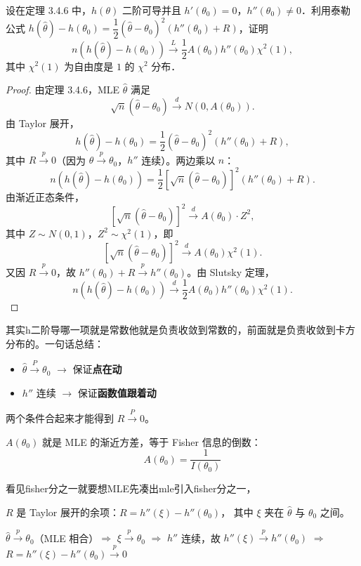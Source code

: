 \begin{homework}[12]
设在定理 3.4.6 中，$h(\theta)$ 二阶可导并且 $h'(\theta_0) = 0$，$h''(\theta_0) \neq 0$．利用泰勒公式 $h(\hat{\theta}) - h(\theta_0) = \dfrac{1}{2}(\hat{\theta} - \theta_0)^2 (h''(\theta_0) + R)$，证明
\[
n(h(\hat{\theta}) - h(\theta_0)) \xrightarrow{L} \frac{1}{2} A(\theta_0) h''(\theta_0) \chi^2(1),
\]
其中 $\chi^2(1)$ 为自由度是 $1$ 的 $\chi^2$ 分布．
\end{homework}
\begin{proof}
由定理 3.4.6，MLE $\hat{\theta}$ 满足
$$\sqrt{n}(\hat{\theta} - \theta_0) \xrightarrow{d} N(0, A(\theta_0)).$$
由 Taylor 展开，
$$h(\hat{\theta}) - h(\theta_0) = \frac{1}{2}(\hat{\theta} - \theta_0)^2(h''(\theta_0) + R),$$
其中 $R \xrightarrow{p} 0$（因为 $\hat{\theta} \xrightarrow{p} \theta_0$，$h''$ 连续）。两边乘以 $n$：
$$n(h(\hat{\theta}) - h(\theta_0)) = \frac{1}{2}\left[\sqrt{n}(\hat{\theta} - \theta_0)\right]^2 (h''(\theta_0) + R).$$
由渐近正态条件，
$$\left[\sqrt{n}(\hat{\theta} - \theta_0)\right]^2 \xrightarrow{d} A(\theta_0) \cdot Z^2,$$
其中 $Z \sim N(0,1)$，$Z^2 \sim \chi^2(1)$，即
$$\left[\sqrt{n}(\hat{\theta} - \theta_0)\right]^2 \xrightarrow{d} A(\theta_0)\chi^2(1).$$
又因 $R \xrightarrow{p} 0$，故 $h''(\theta_0) + R \xrightarrow{p} h''(\theta_0)$。由 Slutsky 定理，
$$n(h(\hat{\theta}) - h(\theta_0)) \xrightarrow{d} \frac{1}{2}A(\theta_0)h''(\theta_0)\chi^2(1).$$
\end{proof}
\begin{dxtips}
    其实h二阶导哪一项就是常数他就是负责收敛到常数的，前面就是负责收敛到卡方分布的。一句话总结：
\begin{itemize}
    \item $\hat{\theta} \xrightarrow{P} \theta_0$ $\rightarrow$ 保证\textbf{点在动}
    \item $h''$ 连续 $\rightarrow$ 保证\textbf{函数值跟着动}
\end{itemize}
两个条件合起来才能得到 $R \xrightarrow{P} 0$。
\end{dxtips}
\begin{dxtips}
$A(\theta_0)$ 就是 MLE 的渐近方差，等于 Fisher 信息的倒数：
$$A(\theta_0) = \frac{1}{I(\theta_0)}$$
\end{dxtips}
\begin{dxtips}
    看见fisher分之一就要想MLE先凑出mle引入fisher分之一，
\end{dxtips}
\begin{dxtips}
    $R$ 是 Taylor 展开的余项：$R = h''(\xi) - h''(\theta_0)$，
其中 $\xi$ 夹在 $\hat{\theta}$ 与 $\theta_0$ 之间。

$\hat{\theta} \xrightarrow{p} \theta_0$（MLE 相合）$\Rightarrow$
$\xi \xrightarrow{p} \theta_0$ $\Rightarrow$
$h''$ 连续，故 $h''(\xi) \xrightarrow{p} h''(\theta_0)$ $\Rightarrow$
$R = h''(\xi) - h''(\theta_0) \xrightarrow{p} 0$
\end{dxtips}
